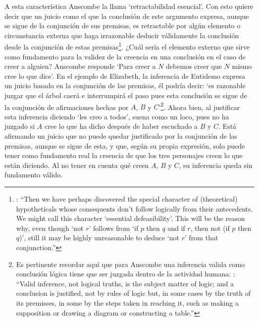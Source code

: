 A esta característica Anscombe la llama `retractabilidad esencial'. Con esto quiere decir que un juicio como el que la conclusión de este argumento expresa, aunque se sigue de la conjunción de sus premisas, es retractable por algún elemento o circunstancia externa que haga irrazonable deducir válidamente la conclusión desde la conjunción de estas premisas\footnote{\cite[Cf.~][299]{anscombe2015logic:qpa}: \enquote{Then we have perhaps discovered the special character of (theoretical) hypotheticals whose consequents don't follow logically from their antecedents. We might call this character `essential defeasibility'. This will be the reason why, even though `not $r$' follows from `if $p$ then $q$ and if $r$, then not (if $p$ then $q$)', still it may be highly unreasonable to deduce `not $r$' from that conjunction.}}. ¿Cuál sería el elemento externo que sirve como fundamento para la validez de la creencia en una conclusión en el caso de creer a alguien? Anscombe responde \enquote*{Para creer a $N$ debemos creer que $N$ mismo cree lo que dice}. En el ejemplo de Elizabeth, la inferencia de Eutidemo expresa un juicio basado en la conjunción de las premisas, él podría decir: \enquote*{es razonable juzgar que el árbol caerá e interrumpirá el paso pues esta conclusión se sigue de la conjunción de afirmaciones hechas por $A$, $B$ y $C$}\footnote{Es pertinente recordar aquí que para Anscombe una inferencia valida como conclusión lógica tiene que ser juzgada dentro de la actividad humana: \cite[121]{anscombe1981parmenides:qli}: \enquote{Valid inference, not logical truths, is the subject matter of logic; and a conclusion is justified, not by rules of logic but, in some cases by the truth of its premisses, in some by the steps taken in reaching it, such as making a supposition or drawing a diagram or constructing a table.}}. Ahora bien, al justificar esta inferencia diciendo \enquote*{les creo a todos}, suena como un loco, pues no ha juzgado si $A$ cree lo que ha dicho después de haber escuchado a $B$ y $C$. Está afirmando un juicio que no puede quedar justificado por la conjunción de las premisas, aunque se sigue de esta, y que, según su propia expresión, solo puede tener como fundamento real la creencia de que los tres personajes creen lo que están diciendo. Al no tener en cuenta qué creen $A$, $B$ y $C$, su inferencia queda sin fundamento válido.

